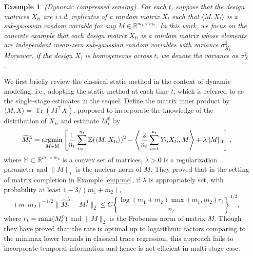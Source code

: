 \documentclass[12pt]{article}
\newtheorem{emp}{Example}
\def\argmin{\mathop{\rm argmin}}
\def\rank{\mathop{\rm rank}}
\def\Tr{\operatorname{Tr}}
\begin{document}
  \begin{emp}\label{emp:cs} (Dynamic compressed sensing).  For each $t$, suppose that the design matrices $X_{ti}$ are i.i.d. replicates of a random matrix $X_t$ such that $\langle M,X_t\rangle$ is a sub-gaussian random variable for any $M\in\mathbb{R}^{m_1\times m_2}$. 
  In this work, we focus on the concrete example that each design matrix $X_{ti}$ is a random matrix whose elements are independent mean-zero sub-gaussian random variables with variance $\sigma_{X_t}^2$. Moreover, if the design $X_t$ is homogeneous across $t$, we denote the variance as $\sigma_{X}^2$. 
  \end{emp} 

  We first briefly review the classical static method in the context of dynamic modeling, i.e., adopting the static method at each time $t$, which is referred to as the single-stage estimates in the sequel. 
  Define the matrix inner product by $\langle M,X\rangle = \Tr(M^\top X)$. 
  \cite{koltchinskii_nuclear-norm_2011} proposed to incorporate the knowledge of the distribution of $X_{ti}$ and estimate $M_t^0$ by
  \begin{equation}\label{eq_classical_estimator}
  \widehat{M}_t^\lambda=\argmin_{M\in\mathbb{M}}\left[\frac{1}{n_t}\sum_{i=1}^{n_t}\mathbb{E}(\langle M,X_{ti} \rangle)^2-\left\langle\frac{2}{n_t}\sum_{i=1}^{n_t} Y_{ti}X_{ti},M\right\rangle+\lambda\|M\|_1\right],
  \end{equation}
  where $\mathbb{M}\subset\mathbb{R}^{m_1\times m_2}$ is a convex set of matrices, $\lambda>0$ is a regularization parameter and $\|M\|_1$ is the nuclear norm of $M$. %
  They proved that in the setting of matrix completion in Example \ref{emp:mc}, %
  if $\lambda$ is appropriately set, with probability at least $1-3/(m_1+m_2)$,
  \begin{equation*}%
  (m_1m_2)^{-1/2}\|\widehat{M}_t^\lambda-M_t^0\|_2\le C\left\{\frac{\log(m_1+m_2)\max(m_1,m_2)r_t}{n_t}\right\}^{1/2}, 
  \end{equation*}
  where $r_t=\rank(M_t^0)$ and $\|M\|_2$ is the Frobenius norm of matrix $M$.
  Though they have proved that the rate is optimal up to logarithmic factors comparing to the minimax lower bounds in classical trace regression,
 this approach fails to incorporate temporal information and hence is not efficient in multi-stage case.
\end{document}
